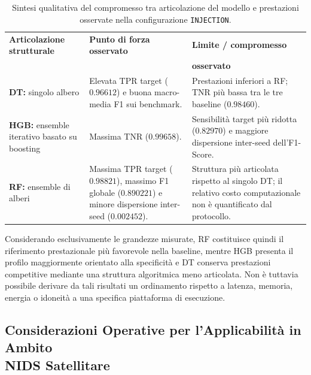 \begin{table}[H]
    \centering
    \small
    \caption{Sintesi qualitativa del compromesso tra articolazione del modello e prestazioni osservate nella configurazione \texttt{INJECTION}.}
    \label{tab:cap5_classifier_tradeoff}
    \begin{tabularx}{\textwidth}{>{\raggedright\arraybackslash}X >{\raggedright\arraybackslash}X >{\raggedright\arraybackslash}X}
        \toprule
        \textbf{Articolazione strutturale} & \textbf{Punto di forza osservato} & \textbf{Limite / compromesso} \\[-5pt]
         & & \textbf{osservato} \\
        \midrule
        \textbf{DT:} singolo albero
        & Elevata TPR target ($0.96612$) e buona macro-media F1 sui benchmark.
        & Prestazioni inferiori a RF; TNR più bassa tra le tre baseline ($0.98460$). \\
        \addlinespace
        \textbf{HGB:} ensemble iterativo basato su boosting
        & Massima TNR ($0.99658$).
        & Sensibilità target più ridotta ($0.82970$) e maggiore dispersione inter-seed dell'F1-Score. \\
        \addlinespace
        \textbf{RF:} ensemble di alberi
        & Massima TPR target ($0.98821$), massimo F1 globale ($0.890221$) e minore dispersione inter-seed ($0.002452$).
        & Struttura più articolata rispetto al singolo DT; il relativo costo computazionale non è quantificato dal protocollo. \\
        \bottomrule
    \end{tabularx}
\end{table}

Considerando esclusivamente le grandezze misurate, RF costituisce quindi il riferimento prestazionale più favorevole nella baseline, mentre HGB presenta il profilo maggiormente orientato alla specificità e DT conserva prestazioni competitive mediante una struttura algoritmica meno articolata. 
Non è tuttavia possibile derivare da tali risultati un ordinamento rispetto a latenza, memoria, energia o idoneità a una specifica piattaforma di esecuzione.



\subsection[Considerazioni Operative per l'Applicabilità in Ambito NIDS Satellitare]{Considerazioni Operative per l'Applicabilità in Ambito\\NIDS Satellitare}
\label{subsec:implicazioni_operative_nids}

